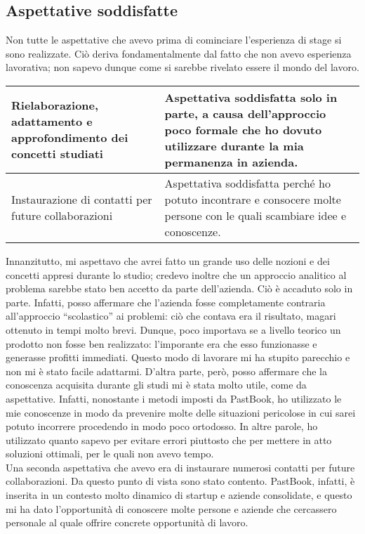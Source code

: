 		\subsection{Aspettative soddisfatte}
			Non tutte le aspettative che avevo prima di cominciare l'esperienza di stage si sono realizzate. Ciò deriva fondamentalmente
			dal fatto che non avevo esperienza lavorativa; non sapevo dunque come si sarebbe rivelato essere il mondo del lavoro.\\
			\begin{center}
				\begin{tabular}[H]{p{} | p{}}
					Rielaborazione, adattamento e approfondimento dei concetti studiati &
					Aspettativa soddisfatta solo in parte, a causa dell'approccio poco formale che ho dovuto utilizzare durante
					la mia permanenza in azienda.\\
					\hline
					Instaurazione di contatti per future collaborazioni &
					Aspettativa soddisfatta perché ho potuto incontrare e consocere molte persone con le quali scambiare idee e
					conoscenze.\\
				\end{tabular}
			\end{center}
			Innanzitutto, mi aspettavo che avrei fatto un grande uso delle nozioni e dei concetti appresi durante lo studio; credevo
			inoltre che un approccio analitico al problema sarebbe stato ben accetto da parte dell'azienda. Ciò è accaduto solo in parte.
			Infatti, posso affermare che l'azienda fosse completamente contraria all'approccio “scolastico” ai problemi: ciò
			che contava era il risultato, magari ottenuto in tempi molto brevi. Dunque, poco importava se a livello teorico un prodotto
			non fosse ben realizzato: l'imporante era che esso funzionasse e generasse profitti immediati. Questo modo di lavorare mi ha
			stupito parecchio e non mi è stato facile adattarmi. D'altra parte, però, posso affermare che la conoscenza acquisita
			durante gli studi mi è stata molto utile, come da aspettative. Infatti, nonostante i metodi imposti da PastBook, ho
			utilizzato le mie conoscenze in modo da prevenire molte delle situazioni pericolose in cui sarei potuto incorrere
			procedendo in modo poco ortodosso. In altre parole, ho utilizzato quanto sapevo per evitare errori piuttosto che per mettere
			in atto soluzioni ottimali, per le quali non avevo tempo.\\
			Una seconda aspettativa che avevo era di instaurare numerosi contatti per future collaborazioni. Da questo punto di vista
			sono stato contento. PastBook, infatti, è inserita in un contesto molto dinamico di startup e aziende consolidate, e questo
			mi ha dato l'opportunità di conoscere molte persone e aziende che cercassero personale al quale offrire concrete opportunità
			di lavoro.
